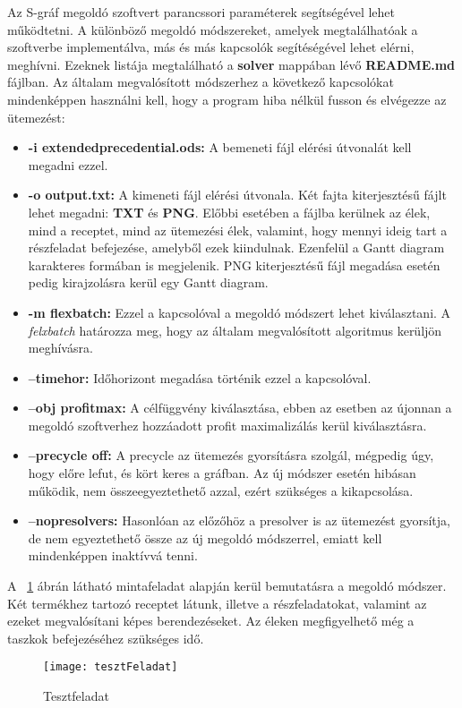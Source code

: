 Az S-gráf megoldó szoftvert parancssori paraméterek segítségével lehet működtetni. A különböző megoldó módszereket, amelyek megtalálhatóak a szoftverbe implementálva, más és más kapcsolók segítéségével lehet elérni, meghívni. Ezeknek listája megtalálható a \textbf{solver} mappában lévő \textbf{README.md} fájlban. Az általam megvalósított módszerhez a következő kapcsolókat mindenképpen használni kell, hogy a program hiba nélkül fusson és elvégezze az ütemezést:
\begin{itemize}
	\item \textbf{-i extended\textunderscore precedential.ods:} A bemeneti fájl elérési útvonalát kell megadni ezzel.
	\item \textbf{-o output.txt:} A kimeneti fájl elérési útvonala. Két fajta kiterjesztésű fájlt lehet megadni: \textbf{TXT} és \textbf{PNG}. Előbbi esetében a fájlba kerülnek az élek, mind a receptet, mind az ütemezési élek, valamint, hogy mennyi ideig tart a részfeladat befejezése, amelyből ezek kiindulnak. Ezenfelül a Gantt diagram karakteres formában is megjelenik. PNG kiterjesztésű fájl megadása esetén pedig kirajzolásra kerül egy Gantt diagram.
	\item \textbf{-m flexbatch:} Ezzel a kapcsolóval a megoldó módszert lehet kiválasztani. A \textit{felxbatch} határozza meg, hogy az általam megvalósított algoritmus kerüljön meghívásra.
	\item \textbf{--timehor:} Időhorizont megadása történik ezzel a kapcsolóval.
	\item \textbf{--obj profit\textunderscore max:} A célfüggvény kiválasztása, ebben az esetben az újonnan a megoldó szoftverhez hozzáadott profit maximalizálás kerül kiválasztásra.
	\item \textbf{--precycle off:} A precycle az ütemezés gyorsításra szolgál, mégpedig úgy, hogy előre lefut, és kört keres a gráfban. Az új módszer esetén hibásan működik, nem összeegyeztethető azzal, ezért szükséges a kikapcsolása.
	\item \textbf{--nopresolvers:} Hasonlóan az előzőhöz a presolver is az ütemezést gyorsítja, de nem egyeztethető össze az új megoldó módszerrel, emiatt kell mindenképpen inaktívvá tenni.
\end{itemize}

A ~\ref{tesztFeladat} ábrán látható mintafeladat alapján kerül bemutatásra a megoldó módszer. Két termékhez tartozó receptet látunk, illetve a részfeladatokat, valamint az ezeket megvalósítani képes berendezéseket. Az éleken megfigyelhető még a taszkok befejezéséhez szükséges idő.
\begin{figure}[H]
\begin{center}
\texttt{[image: tesztFeladat]}
\caption{Tesztfeladat}
\label{tesztFeladat}
\end{center}
\end{figure}

